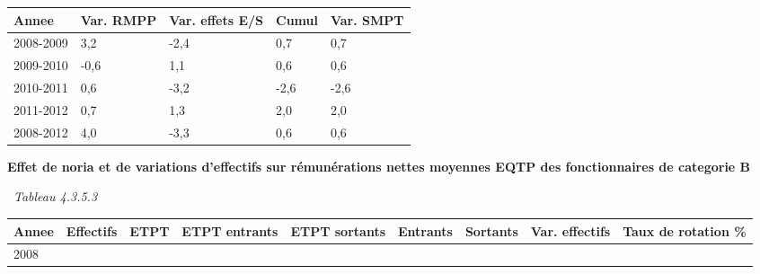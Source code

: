 \begin{longtable}[]{@{}lllll@{}}
\toprule
Annee & Var. RMPP & Var. effets E/S & Cumul & Var. SMPT\tabularnewline
\midrule
\endhead
2008-2009 & 3,2 & -2,4 & 0,7 & 0,7\tabularnewline
2009-2010 & -0,6 & 1,1 & 0,6 & 0,6\tabularnewline
2010-2011 & 0,6 & -3,2 & -2,6 & -2,6\tabularnewline
2011-2012 & 0,7 & 1,3 & 2,0 & 2,0\tabularnewline
2008-2012 & 4,0 & -3,3 & 0,6 & 0,6\tabularnewline
\bottomrule
\end{longtable}

\textbf{Effet de noria et de variations d'effectifs sur rémunérations
nettes moyennes EQTP des fonctionnaires de categorie B}

~\emph{Tableau 4.3.5.3}

\begin{longtable}[]{@{}lllllllll@{}}
\toprule
\begin{minipage}[b]{0.05\columnwidth}\raggedright
Annee\strut
\end{minipage} & \begin{minipage}[b]{0.08\columnwidth}\raggedright
Effectifs\strut
\end{minipage} & \begin{minipage}[b]{0.05\columnwidth}\raggedright
ETPT\strut
\end{minipage} & \begin{minipage}[b]{0.10\columnwidth}\raggedright
ETPT entrants\strut
\end{minipage} & \begin{minipage}[b]{0.10\columnwidth}\raggedright
ETPT sortants\strut
\end{minipage} & \begin{minipage}[b]{0.07\columnwidth}\raggedright
Entrants\strut
\end{minipage} & \begin{minipage}[b]{0.07\columnwidth}\raggedright
Sortants\strut
\end{minipage} & \begin{minipage}[b]{0.11\columnwidth}\raggedright
Var. effectifs\strut
\end{minipage} & \begin{minipage}[b]{0.14\columnwidth}\raggedright
Taux de rotation \%\strut
\end{minipage}\tabularnewline
\midrule
\endhead
\begin{minipage}[t]{0.05\columnwidth}\raggedright
2008\strut
\end{minipage} & \begin{minipage}[t]{0.08\columnwidth}\raggedright

\end{minipage}
\end{longtable}

